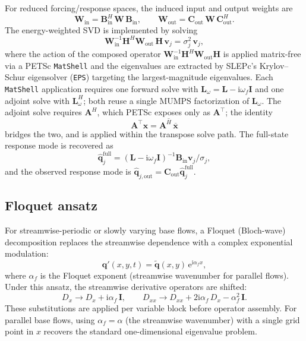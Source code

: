 \documentclass[11pt]{article}
\newcommand{\bq}{\mathbf{q}}
\newcommand{\bqp}{\mathbf{q}'}
\newcommand{\bx}{\mathbf{x}}
\newcommand{\bA}{\mathbf{A}}
\newcommand{\bB}{\mathbf{B}}
\newcommand{\bC}{\mathbf{C}}
\newcommand{\bH}{\mathbf{H}}
\newcommand{\bI}{\mathbf{I}}
\newcommand{\bL}{\mathbf{L}}
\newcommand{\bW}{\mathbf{W}}
\newcommand{\bv}{\mathbf{v}}
\begin{document}
For reduced forcing/response spaces, the induced input and output weights are
\[
  \bW_{\mathrm{in}} = \bB_{\mathrm{in}}^H\,\bW\,\bB_{\mathrm{in}},
  \qquad
  \bW_{\mathrm{out}} = \bC_{\mathrm{out}}\,\bW\,\bC_{\mathrm{out}}^H.
\]
The energy-weighted SVD is implemented by solving
\begin{equation}
  \bW_{\mathrm{in}}^{-1}\bH^H\bW_{\mathrm{out}}\,\bH\,\bv_j = \sigma_j^2\,\bv_j,
  \label{eq:weighted_svd}
\end{equation}
where the action of the composed operator $\bW_{\mathrm{in}}^{-1}\bH^H\bW_{\mathrm{out}}\bH$ is applied matrix-free via a PETSc \texttt{MatShell} and the eigenvalues are extracted by SLEPc's Krylov--Schur eigensolver (\texttt{EPS}) targeting the largest-magnitude eigenvalues.
Each \texttt{MatShell} application requires one forward solve with $\bL_\omega = \bL - \mathrm{i}\omega_f\bI$ and one adjoint solve with $\bL_\omega^H$; both reuse a single MUMPS factorization of $\bL_\omega$.
The adjoint solve requires $\bA^H$, which PETSc exposes only as $\bA^\top$; the identity
\begin{equation}
  \bA^\top\bx = \overline{\bA^H\,\overline{\bx}}
  \label{eq:transpose_identity}
\end{equation}
bridges the two, and is applied within the transpose solve path.
The full-state response mode is recovered as
\[
  \hat{\bq}^{\mathrm{full}}_j = (\bL - \mathrm{i}\omega_f\bI)^{-1}\bB_{\mathrm{in}}\bv_j/\sigma_j,
\]
and the observed response mode is $\hat{\bq}_{j,\mathrm{out}} = \bC_{\mathrm{out}}\hat{\bq}^{\mathrm{full}}_j$.

\subsection{Floquet ansatz}
\label{sec:floquet}

For streamwise-periodic or slowly varying base flows, a Floquet (Bloch-wave) decomposition replaces the streamwise dependence with a complex exponential modulation:
\begin{equation}
  \bqp(x,y,t) = \tilde{\bq}(x,y)\,\mathrm{e}^{\mathrm{i}\alpha_f x},
\end{equation}
where $\alpha_f$ is the Floquet exponent (streamwise wavenumber for parallel flows).
Under this ansatz, the streamwise derivative operators are shifted:
\begin{equation}
  D_x \to D_x + \mathrm{i}\alpha_f\,\bI,
  \qquad
  D_{xx} \to D_{xx} + 2\mathrm{i}\alpha_f\,D_x - \alpha_f^2\,\bI.
  \label{eq:floquet_shift}
\end{equation}
These substitutions are applied per variable block before operator assembly.
For parallel base flows, using $\alpha_f = \alpha$ (the streamwise wavenumber) with a single grid point in $x$ recovers the standard one-dimensional eigenvalue problem.
\end{document}
